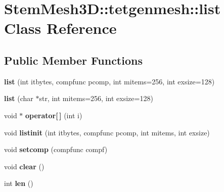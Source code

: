 \hypertarget{classStemMesh3D_1_1tetgenmesh_1_1list}{}\section{Stem\+Mesh3D\+:\+:tetgenmesh\+:\+:list Class Reference}
\label{classStemMesh3D_1_1tetgenmesh_1_1list}
\subsection*{Public Member Functions}
\begin{DoxyCompactItemize}
\item 
\mbox{\label{classStemMesh3D_1_1tetgenmesh_1_1list_a6f96ef4612ca0960b99f31d575d7e20f}} 
{\bfseries list} (int itbytes, compfunc pcomp, int mitems=256, int exsize=128)
\item 
\mbox{\label{classStemMesh3D_1_1tetgenmesh_1_1list_a7ef2cba610b899349de44c375bdd1aa9}} 
{\bfseries list} (char $\ast$str, int mitems=256, int exsize=128)
\item 
\mbox{\label{classStemMesh3D_1_1tetgenmesh_1_1list_a78c08c05ee1c591bf88030241c808de2}} 
void $\ast$ {\bfseries operator\mbox{[}$\,$\mbox{]}} (int i)
\item 
\mbox{\label{classStemMesh3D_1_1tetgenmesh_1_1list_afc6efbc41dc8ca6f574ff51a01c22a0c}} 
void {\bfseries listinit} (int itbytes, compfunc pcomp, int mitems, int exsize)
\item 
\mbox{\label{classStemMesh3D_1_1tetgenmesh_1_1list_af4381844c6ba1d6c1d810072e22106dc}} 
void {\bfseries setcomp} (compfunc compf)
\item 
\mbox{\label{classStemMesh3D_1_1tetgenmesh_1_1list_a64e7fcc6bccdd2f4d53238298cfeb36f}} 
void {\bfseries clear} ()
\item 
\mbox{\label{classStemMesh3D_1_1tetgenmesh_1_1list_ad42545c80b7b4de8c1185b3d8aa32f28}} 
int {\bfseries len} ()
\item 

\end{DoxyCompactItemize}
